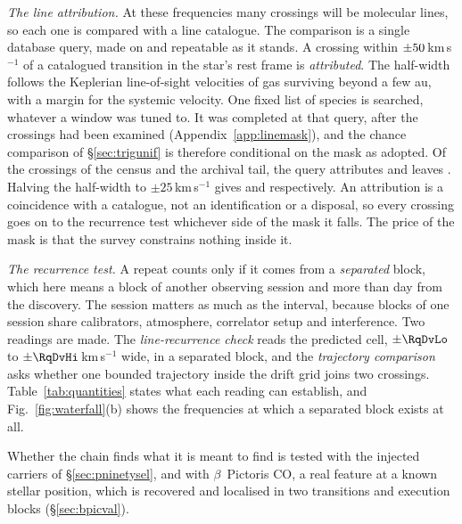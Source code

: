 \emph{The line attribution.} At these frequencies many crossings will be
molecular lines, so each one is compared with a line catalogue. The
comparison is a single database query, made on \MkListDate{} and repeatable
as it stands. A crossing within $\pm50$\,km\,s$^{-1}$ of a
catalogued transition in the star's rest frame is \emph{attributed}. The
half-width follows the Keplerian line-of-sight velocities of gas surviving
beyond a few au, with a margin for the systemic velocity. One fixed list of
\FrNSpec{} species is searched, whatever a window was tuned to. It was
completed at that query, after the crossings had been examined
(Appendix~\ref{app:linemask}), and the chance comparison of
\S\ref{sec:trigunif} is therefore conditional on the mask as adopted. Of the
\CnCross{} crossings of the census and the archival tail, the query attributes
\FrAttrWFifty{} and leaves \FrUnattrWFifty. Halving the half-width to
$\pm25$\,km\,s$^{-1}$ gives \FrAttrWTwentyFive{} and \FrUnattrWTwentyFive{}
respectively.
An attribution is a coincidence with a catalogue, not an identification or a
disposal, so every crossing goes on to the recurrence test whichever side of
the mask it falls. The price of the mask is that the survey constrains
nothing inside it.

\emph{The recurrence test.} A repeat counts only if it comes from a
\emph{separated} block, which here means a block of another observing session
and more than \EpSep{} day from the discovery. The session matters as much as
the interval, because blocks of one session share calibrators, atmosphere,
correlator setup and interference. Two readings are made. The
\emph{line-recurrence check} reads the predicted cell, $\pm\RqDvLo$ to
$\pm\RqDvHi$\,km\,s$^{-1}$ wide, in a separated block, and the
\emph{trajectory comparison} asks whether one bounded trajectory inside the
drift grid joins two crossings. Table~\ref{tab:quantities} states what each
reading can establish, and Fig.~\ref{fig:waterfall}(b) shows the frequencies
at which a separated block exists at all.

Whether the chain finds what it is meant to find is tested with the injected
carriers of \S\ref{sec:pninetysel}, and with $\beta$~Pictoris CO, a real
feature at a known stellar position, which is recovered and localised in two
transitions and \CsBpCoBlocks{} execution blocks (\S\ref{sec:bpicval}).


